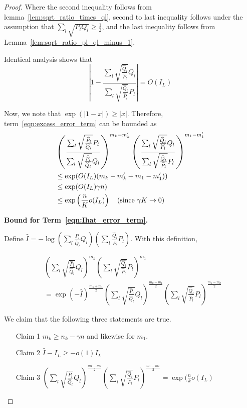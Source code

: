 \begin{proof}
Where the second inequality follows from lemma~\ref{lem:sqrt_ratio_times_ql},
second to last inequality follows under the assumption that $\sum_l \sqrt{P_l Q_l} \geq \frac{1}{2}$, and the last inequality follows from Lemma~\ref{lem:sqrt_ratio_pl_ql_minus_1}. 

Identical analysis shows that
\[
\left| 1 - \frac{ \sum_l \sqrt{\frac{\hat{Q}_l}{\hat{P}_l} } Q_l}
             { \sum_l \sqrt{\frac{\hat{Q}_l}{\hat{P}_l} } P_l} \right| 
= O(I_L) 
\]

Now, we note that $\exp( | 1 - x | ) \geq |x|$. 
Therefore, term~\ref{eqn:excess_error_term} can be bounded as
\begin{align*}
&  \left( \frac{\sum_l \sqrt{\frac{\widehat{P}_l}{\widehat{Q}_l} } P_l}
                {\sum_l \sqrt{\frac{\widehat{P}_l}{\widehat{Q}_l} } Q_l}  \right)^{m_k - m_k'}
 \left( \frac{ \sum_l \sqrt{\frac{\widehat{Q}_l}{\widehat{P}_l} } Q_l}
             { \sum_l \sqrt{\frac{\widehat{Q}_l}{\widehat{P}_l} } P_l} \right)^{m_1 - m_1'}  \\
&\leq \exp( O(I_L) (m_k - m_k' + m_1 - m_1') ) \\
&\leq \exp( O(I_L) \gamma n) \\
&\leq \exp\left( \frac{n}{K} o(I_L) \right) \quad \textrm{(since $\gamma K \rightarrow 0$)}
\end{align*}

\textbf{Bound for Term~\ref{eqn:Ihat_error_term}.}


Define 
$\hat{I} = - \log \left( \sum_l \frac{\hat{P}_l}{\hat{Q}_l} Q_l \right) \left( \sum_l \frac{\hat{Q}_l}{\hat{P}_l} P_l \right) $. 
With this definition, 

\begin{align*}
& \left( \sum_l \sqrt{\frac{\hat{P}_l}{\hat{Q}_l} } Q_l \right)^{m_k} 
       \left( \sum_l \sqrt{\frac{\hat{Q_l}}{\hat{P}_l} } P_l \right)^{m_1} \\
&= \exp( - \hat{I} )^{\frac{m_k + m_1}{2}}  \left( \sum_l \sqrt{\frac{\hat{P}_l}{\hat{Q}_l}} Q_l \right)^{\frac{m_k - m_1}{2}} 
 \left( \sum_l \sqrt{\frac{\hat{Q}_l}{\hat{P}_l}} P_l \right)^{\frac{m_1 - m_k}{2}} 
\end{align*}

We claim that the following three statements are true. 
\begin{enumerate}
\item[Claim 1] $m_k \geq n_k -  \gamma n$ and likewise for $m_1$.
\item[Claim 2] $\hat{I} - I_L \geq - o(1) I_L$
\item[Claim 3] $\left( \sum_l \sqrt{\frac{\hat{P}_l}{\hat{Q}_l}} Q_l \right)^{\frac{m_k - m_1}{2}} 
 \left( \sum_l \sqrt{\frac{\hat{Q}_l}{\hat{P}_l}} P_l \right)^{\frac{m_1 - m_k}{2}} = \exp(\frac{n}{k}  o(I_L)  $
\end{enumerate}


\end{proof}
